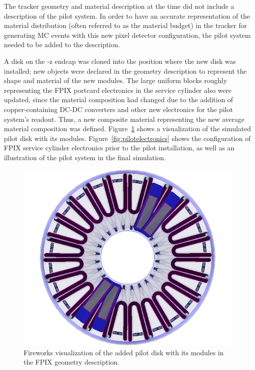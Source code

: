 The tracker geometry and material description at the time did not include a description of the pilot system. In order to have an accurate representation of the material distribution (often referred to as the material budget) in the tracker for generating MC events with this new pixel detector configuration, the pilot system needed to be added to the description.

A disk on the -z endcap was cloned into the position where the new disk was installed; new objects were declared in the geometry description to represent the shape and material of the new modules. The large uniform blocks roughly representing the FPIX portcard electronics in the service cylinder also were updated, since the material composition had changed due to the addition of copper-containing DC-DC converters and other new electronics for the pilot system's readout. Thus, a new composite material representing the new average material composition was defined. Figure~\ref{fig:pilotmodules_sim} shows a visualization of the simulated pilot disk with its modules. Figure~\ref{fig:pilotelectronics} shows the configuration of FPIX service cylinder electronics prior to the pilot installation, as well as an illustration of the pilot system in the final simulation.

\begin{figure}[hbtp]
  \begin{center}
    \includegraphics[width=\cmsFigWidth]{figures/ModulesCorrectedFurther}
    \caption{Fireworks visualization of the added pilot disk with its modules in the FPIX geometry description.}
    \label{fig:pilotmodules_sim}
  \end{center}
\end{figure}

